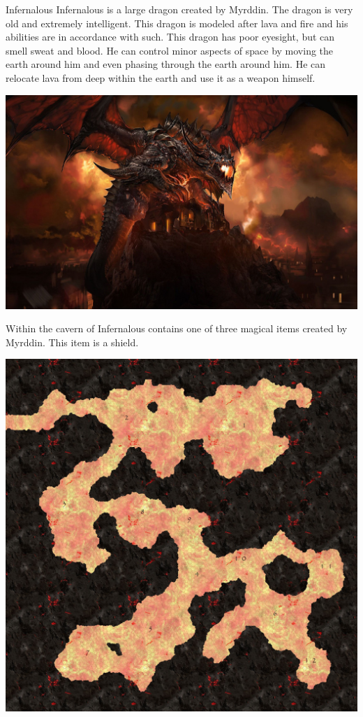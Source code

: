 \begin{commentbox}{Infernalous}
	Infernalous is a large dragon created by Myrddin. The dragon is very old and extremely intelligent. This dragon is modeled after lava and fire and his abilities are in accordance with such. This dragon has poor eyesight, but can smell sweat and blood. He can control minor aspects of space by moving the earth around him and even phasing through the earth around him. He can relocate lava from deep within the earth and use it as a weapon himself.
	
	\begin{center}
	\includegraphics[width=0.8\linewidth]{img/WoW/deathwing.jpg}
	\end{center}

	Within the cavern of Infernalous contains one of three magical items created by Myrddin. This item is a shield.

	\begin{center}
	\includegraphics[width=0.8\linewidth]{img/maps/infernalous.jpg}
	\end{center}
\end{commentbox}

